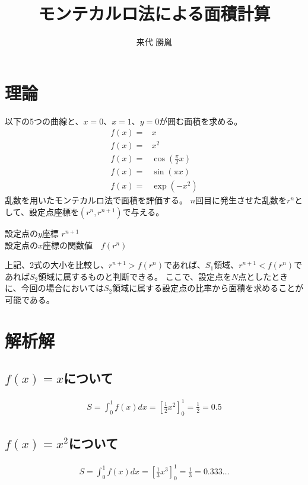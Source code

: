 \documentclass[12pt,a4paper]{jsarticle}
\author{来代 勝胤}
\title{モンテカルロ法による面積計算}
\begin{document}
\maketitle
\thispagestyle{empty}
\clearpage
\addtocounter{page}{-1}


\begin{flushleft}
    {
        \LARGE \textbf{}
    }
\end{flushleft}
\section{理論}
以下の5つの曲線と、$x=0$、$x=1$、$y=0$が囲む面積を求める。
\begin{eqnarray}
    f(x)=&x\\
    f(x)=&x^2\\
    f(x)=&\cos\left(\frac{\pi}{2}x\right)\\
    f(x)=&\sin\left(\pi x\right) \\
    f(x)=&\exp\left(-x^2\right)
\end{eqnarray}
乱数を用いたモンテカルロ法で面積を評価する。
$n$回目に発生させた乱数を$r^n$として、設定点座標を$\left(r^n, r^{n+1}\right)$で与える。\\
\begin{center}
    設定点の$y$座標          $r^{n+1}$\\
    設定点の$x$座標の関数値　$f\left(r^n\right)$
\end{center}
上記、2式の大小を比較し、$r^{n+1}>f(r^n)$であれば、$S_1$領域、$r^{n+1}<f(r^n)$であれば$S_2$領域に属するものと判断できる。
ここで、設定点を$N$点としたときに、今回の場合においては$S_2$領域に属する設定点の比率から面積を求めることが可能である。\\
\section{解析解}
\subsection{$f\left(x\right)=x$について}
\begin{eqnarray}
    S=\int_0^1f\left(x\right)dx=\left[\frac{1}{2}x^2\right]_0^1=\frac{1}{2}=0.5
\end{eqnarray}
\subsection{$f\left(x\right)=x^2$について}
\begin{eqnarray}
    S=\int_0^1f\left(x\right)dx=\left[\frac{1}{3}x^3\right]_0^1=\frac{1}{3}=0.333\dots
\end{eqnarray}
\end{document}
